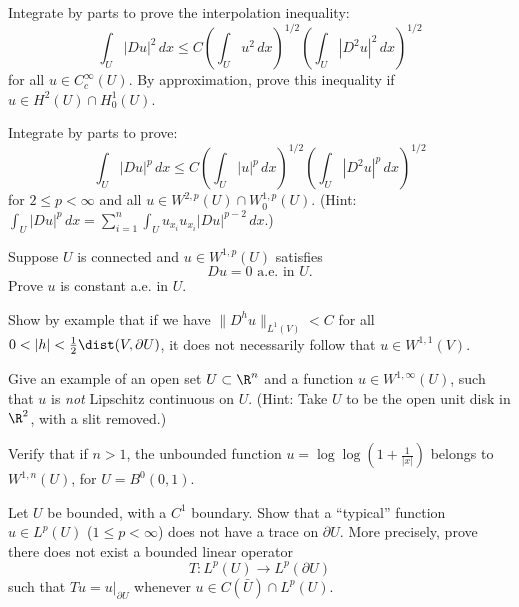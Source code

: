 \begin{exercise}
Integrate by parts to prove the interpolation inequality:
$$\int_U |Du|^2\,dx \le C \left(\int_U u^2\,dx\right)^{1/2} \left(\int_U |D^2u|^2\,dx\right)^{1/2}$$
for all $u \in C_c^\infty(U)$. By approximation, prove this inequality if $u \in H^2(U) \cap H^1_0(U)$.
\end{exercise}

\begin{exercise}
Integrate by parts to prove:
$$\int_U |Du|^p\,dx \le C \left(\int_U |u|^p\,dx\right)^{1/2} \left(\int_U |D^2u|^p\,dx\right)^{1/2}$$
for $2 \le p < \infty$ and all $u \in W^{2,p}(U) \cap W^{1,p}_0(U)$. (Hint: $\int_U |Du|^p\,dx = \sum_{i=1}^n \int_U u_{x_i} u_{x_i} |Du|^{p-2}\,dx.$)
\end{exercise}

\begin{exercise}
Suppose $U$ is connected and $u \in W^{1,p}(U)$ satisfies
$$Du = 0 \text{ a.e. in } U.$$
Prove $u$ is constant a.e. in $U$.
\end{exercise}

\begin{exercise}
Show by example that if we have $\|D^h u\|_{L^1(V)} < C$ for all $0 < |h| < \frac{1}{2}\dist(V, \partial U)$, it does not necessarily follow that $u \in W^{1,1}(V)$.
\end{exercise}

\begin{exercise}
Give an example of an open set $U \subset \R^n$ and a function $u \in W^{1,\infty}(U)$, such that $u$ is \textit{not} Lipschitz continuous on $U$. (Hint: Take $U$ to be the open unit disk in $\R^2$, with a slit removed.)
\end{exercise}

\begin{exercise}
Verify that if $n > 1$, the unbounded function $u = \log \log\left(1 + \frac{1}{|x|}\right)$ belongs to $W^{1,n}(U)$, for $U = B^0(0,1)$.
\end{exercise}

\begin{exercise}
Let $U$ be bounded, with a $C^1$ boundary. Show that a ``typical'' function $u \in L^p(U)$ ($1 \le p < \infty$) does not have a trace on $\partial U$. More precisely, prove there does not exist a bounded linear operator
$$T : L^p(U) \to L^p(\partial U)$$
such that $Tu = u|_{\partial U}$ whenever $u \in C(\bar{U}) \cap L^p(U)$.
\end{exercise}

